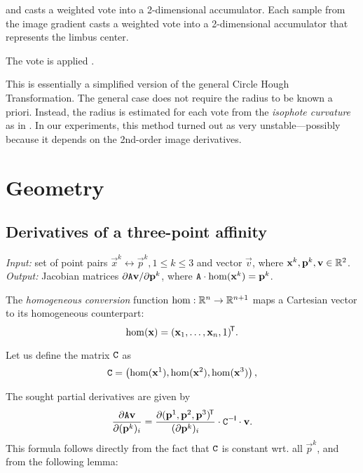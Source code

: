 and casts a weighted vote into a 2-dimensional accumulator.
Each sample from the image gradient casts a weighted vote into a 2-dimensional accumulator that represents the limbus center.

The vote is applied \todo{\dots}.

This is essentially a simplified version of the general Circle Hough Transformation.
The general case does not require the radius to be known a priori.
Instead, the radius is estimated for each vote from the \textit{isophote curvature} as in \cite{valenti08,leo14}.
In our experiments, this method turned out as very unstable---possibly because it depends on the 2nd-order image derivatives.

\section{Geometry}

\subsection{Derivatives of a three-point affinity}
\label{s:algo-daff}
\textit{Input:} set of point pairs $\vec x^k \leftrightarrow \vec p^k, 1 \leq k \leq 3$ and vector $\vec v$, where $\mathbf{x}^k, \mathbf{p}^k, \mathbf{v} \in \mathbb{R}^2$.\\
\textit{Output:} Jacobian matrices $\partial \mathtt{A} \mathbf{v} / \partial \mathbf{p}^k$, where $\mathtt{A} \cdot \mathrm{hom}(\mathbf{x}^k) = \mathbf{p}^k$.\\

\begin{definition}
The \textit{homogeneous conversion} function $\mathrm{hom}: \mathbb{R}^n \to \mathbb{R}^{n + 1}$ maps a Cartesian vector to its homogeneous counterpart:
$$
\mathrm{hom}(\mathbf{x}) = (\mathbf{x}_1, \dots, \mathbf{x}_n, 1)^{\!\mathsf{T}}.
$$
\end{definition}

Let us define the matrix $\mathtt{C}$ as 
\begin{equation}
\mathtt{C} = \left( \mathrm{hom}(\mathbf{x}^1), \mathrm{hom}(\mathbf{x}^2), \mathrm{hom}(\mathbf{x}^3) \right),
\end{equation}

The sought partial derivatives are given by
\begin{equation} \label{e:algo-aff}
\frac {\partial \mathtt{A} \mathbf{v}} {\partial (\mathbf{p}^k)_i} = \frac {\partial (\mathbf{p}^1, \mathbf{p}^2, \mathbf{p}^3)^{\!\mathsf{T}}} {(\partial \mathbf{p}^k)_i} \cdot \mathtt{C} ^{-\mathsf{I}} \cdot \mathbf{v}.
\end{equation}
This formula follows directly from the fact that $\mathtt{C}$ is constant wrt. all $\vec p^k$, and from the following lemma:


